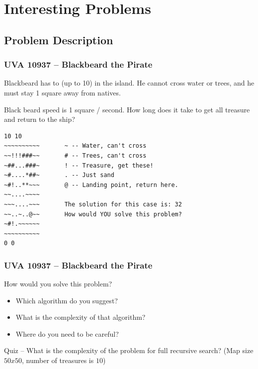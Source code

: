 
\section{Interesting Problems}
\subsection{Problem Description}


\begin{frame}[fragile]
  \frametitle{UVA 10937 -- Blackbeard the Pirate}

  {\smaller

    \begin{block}{}
      Blackbeard has to  (up to 10)
      in the island. He \alert{cannot cross} water or trees, and he
      must stay 1 square away from natives.

      \medskip

      Black beard speed is 1 square / second. How long does it take
      to get all treasure and return to the ship?
    \end{block}

\begin{verbatim}
10 10
~~~~~~~~~~       ~ -- Water, can't cross
~~!!!###~~       # -- Trees, can't cross
~##...###~       ! -- Treasure, get these!
~#....*##~       . -- Just sand
~#!..**~~~       @ -- Landing point, return here.
~~....~~~~
~~~....~~~       The solution for this case is: 32
~~..~..@~~       How would YOU solve this problem?
~#!.~~~~~~
~~~~~~~~~~
0 0
\end{verbatim}
}
\end{frame}

\begin{frame}
  \frametitle{UVA 10937 -- Blackbeard the Pirate}

  How would you solve this problem?

  \vfill

  \begin{itemize}
  \item Which algorithm do you suggest?
    \bigskip

  \item What is the complexity of that algorithm?

    \bigskip
  \item Where do you need to be careful?
  \end{itemize}

  \bigskip

  \alert{Quiz} -- What is the complexity of the problem for full
  recursive search? (Map size $50x50$, number of treasures is $10$)

\end{frame}

